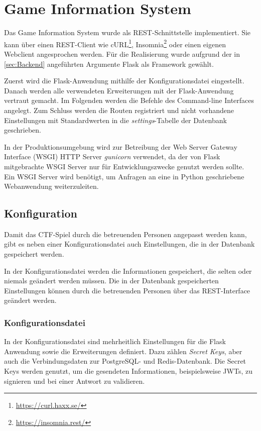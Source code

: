 \textbf{}\section{Game Information System}
Das Game Information System wurde als REST-Schnittstelle implementiert. Sie kann über einen REST-Client wie cURL\footnote{\url{https://curl.haxx.se/}}, Insomnia\footnote{\url{https://insomnia.rest/}} oder einen eigenen Webclient angesprochen werden. Für die Realisierung wurde aufgrund der in \autoref{sec:Backend} angeführten Argumente Flask als Framework gewählt.

Zuerst wird die Flask-Anwendung mithilfe der Konfigurationsdatei eingestellt. Danach werden alle verwendeten Erweiterungen mit der Flask-Anwendung vertraut gemacht. Im Folgenden werden die Befehle des Command-line Interfaces angelegt. Zum Schluss werden die Routen registriert und nicht vorhandene Einstellungen mit Standardwerten in die \textit{settings}-Tabelle der Datenbank geschrieben.

In der Produktionsumgebung wird zur Betreibung der Web Server Gateway Interface (WSGI) HTTP Server \textit{gunicorn} verwendet, da der von Flask mitgebrachte WSGI Server nur für Entwicklungszwecke genutzt werden sollte. Ein WSGI Server wird benötigt, um Anfragen an eine in Python geschriebene Webanwendung weiterzuleiten.

\subsection{Konfiguration}
Damit das CTF-Spiel durch die betreuenden Personen angepasst werden kann, gibt es neben einer Konfigurationsdatei auch Einstellungen, die in der Datenbank gespeichert werden.

In der Konfigurationsdatei werden die Informationen gespeichert, die selten oder niemals geändert werden müssen. Die in der Datenbank gespeicherten Einstellungen können durch die betreuenden Personen über das REST-Interface geändert werden.

\subsubsection{Konfigurationsdatei}
In der Konfigurationsdatei sind mehrheitlich Einstellungen für die Flask Anwendung sowie die Erweiterungen definiert. Dazu zählen \textit{Secret Keys}, aber auch die Verbindungsdaten zur PostgreSQL- und Redis-Datenbank. Die Secret Keys werden genutzt, um die gesendeten Informationen, beispielsweise JWTs, zu signieren und bei einer Antwort zu validieren.

